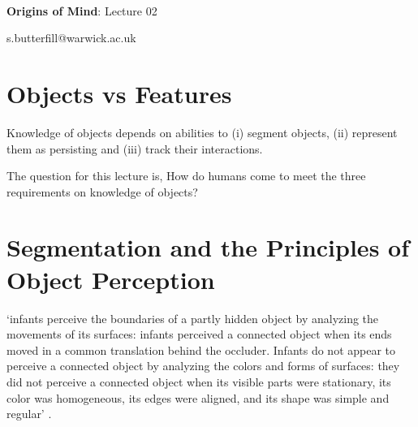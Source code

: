 \documentclass[12pt]{extarticle}
\date{}
\makeatletter
\def \ititle {Origins of Mind}
\def \isubtitle {Lecture 02}
\def \iemail{s.butterfill@warwick.ac.uk}
\makeatother
\begin{document}
\begin{multicols}{3}

\setlength\footnotesep{1em}










\def \ititle {Origins of Mind}
 
\def \isubtitle {Lecture 02}
 
 
 
\
 
 
 
\begin{center}
 
{\Large
 
\textbf{\ititle}: \isubtitle
 
}
 
 
 
\iemail %
 
\end{center}
 
 
 
\section{Objects vs Features}
 
Knowledge of objects depends on abilities to (i) segment objects, (ii) represent them as 
persisting and (iii) track their interactions.
 
The question for this lecture is,
How do humans come to meet the three requirements on knowledge of objects?
 
 
 
\section{Segmentation and the Principles of Object Perception}
 
`infants perceive the boundaries of a partly hidden object by analyzing the movements of 
its surfaces: infants perceived a connected object when its ends moved in a common 
translation behind the occluder. Infants do not appear to perceive a connected object 
by analyzing the colors and forms of surfaces: they did not perceive a connected object 
when its visible parts were stationary, its color was homogeneous, its edges were aligned, 
and its shape was simple and regular'  \citep{kellman:1983_perception}.
 

\end{multicols}
\end{document}
